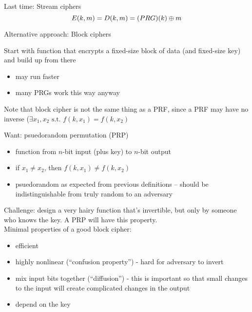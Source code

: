 

Last time: Stream ciphers
    $$E(k,m) = D(k, m) = \text(PRG)(k) \oplus m$$

Alternative approach: Block ciphers

Start with function that encrypts a fixed-size block of data (and fixed-size
        key) and build up from there
\begin{itemize}
    \item may run faster
    \item many PRGs work this way anyway
\end{itemize}

Note that block cipher is not the same thing as a PRF, since a PRF may have no
    inverse ($\exists x_1, x_2 \text{ s.t. } f(k,x_1) = f(k,x_2)$

Want: psuedorandom permutation (PRP)
\begin{itemize}
    \item function from $n$-bit input (plus key) to $n$-bit output
    \item if $x_1 \neq x_2$, then $f(k, x_1) \neq f(k, x_2)$
    \item psuedorandom as expected from previous definitions -- should be
        indistinguishable from truly random to an adversary
\end{itemize}

Challenge: design a very hairy function that's invertible, but only by someone
who knows the key. A PRP will have this property.\\

Minimal properties of a good block cipher:
\begin{itemize}
    \item efficient
    \item highly nonlinear (``confusion property'') - hard for adversary to
        invert
    \item mix input bits together (``diffusion'') - this is important so that
        small changes to the input will create complicated changes in the output
    \item depend on the key
\end{itemize}

